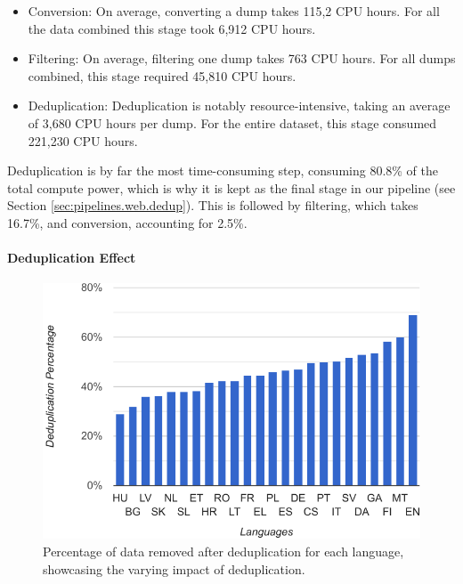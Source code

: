 \begin{itemize}
    \item Conversion: On average, converting a dump takes 115,2 CPU hours. For all the data combined this stage took 6,912 CPU hours.
    \item Filtering: On average, filtering one dump takes 763 CPU hours. For all dumps combined, this stage required 45,810 CPU hours. 
    \item Deduplication: Deduplication is notably resource-intensive, taking an average of 3,680 CPU hours per dump. For the entire dataset, this stage consumed 221,230 CPU hours. 
\end{itemize}


Deduplication is by far the most time-consuming step, consuming 80.8\% of the total compute power, which is why it is kept as the final stage in our pipeline (see Section \ref{sec:pipelines.web.dedup}). This is followed by filtering, which takes 16.7\%, and conversion, accounting for 2.5\%.




\paragraph{Deduplication Effect}

\begin{figure}
  \centering
  \includegraphics[width=0.7\linewidth]{images/Analysis/dedup_perc_lang.pdf}
  \caption{ Percentage of data removed after deduplication for each language, showcasing the varying impact of deduplication.} 
  \label{fig:dedup_perc_lang}
\end{figure}



